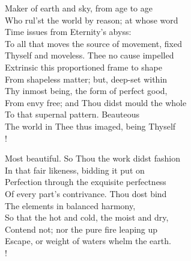 \documentclass[12pt]{book}
\newenvironment{ipoem}[1]%
  {\setcounter{poemindentevery}{#1}\begin{poem}\small}%
  {\end{poem}\setcounter{poemindentevery}{0}}
\begin{document}
\begin{ipoem}{0}
    Maker of earth and sky, from age to age \\
    Who rul'st the world by reason; at whose word \\
    Time issues from Eternity's abyss: \\
    To all that moves the source of movement, fixed \\
    Thyself and moveless. Thee no cause impelled \\
    Extrinsic this proportioned frame to shape \\
    From shapeless matter; but, deep-set within \\
    Thy inmost being, the form of perfect good, \\
    From envy free; and Thou didst mould the whole \\
    To that supernal pattern. Beauteous \\
    The world in Thee thus imaged, being Thyself \\!

    Most beautiful. So Thou the work didst fashion \\
    In that fair likeness, bidding it put on \\
    Perfection through the exquisite perfectness \\
    Of every part's contrivance. Thou dost bind \\
    The elements in balanced harmony, \\
    So that the hot and cold, the moist and dry, \\
    Contend not; nor the pure fire leaping up \\
    Escape, or weight of waters whelm the earth. \\!


\end{ipoem}
\end{document}
